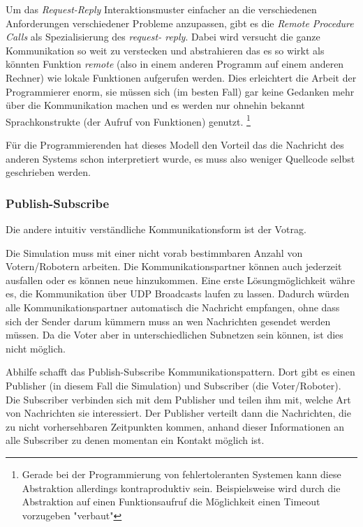 Um das \textit{Request-Reply} Interaktionsmuster einfacher an die verschiedenen Anforderungen verschiedener
Probleme anzupassen, gibt es die \textit{Remote Procedure Calls} als Spezialisierung des \textit{request-
reply}. Dabei wird versucht die ganze Kommunikation so weit zu verstecken und abstrahieren das es so wirkt
als k{\"{o}}nnten Funktion \textit{remote} (also in einem anderen Programm auf einem anderen Rechner) wie
lokale Funktionen aufgerufen werden. Dies erleichtert die Arbeit der Programmierer enorm, sie m{\"{u}}ssen
sich (im besten Fall) gar keine Gedanken mehr {\"{u}}ber die Kommunikation machen und es werden nur
ohnehin bekannt Sprachkonstrukte (der Aufruf von Funktionen) genutzt.
\footnote{Gerade bei der Programmierung von fehlertoleranten Systemen kann diese Abstraktion allerdings
kontraproduktiv sein. Beispielsweise wird durch die Abstraktion auf einen Funktionsaufruf die M{\"{o}}glichkeit
einen Timeout vorzugeben "verbaut"}

F{\"{u}}r die Programmierenden hat dieses Modell den Vorteil das die Nachricht des anderen Systems schon
interpretiert wurde, es muss also weniger Quellcode selbst geschrieben werden.

\subsubsection{Publish-Subscribe}
Die andere intuitiv verst{\"{a}}ndliche Kommunikationsform ist der Votrag.

Die Simulation muss mit einer nicht vorab bestimmbaren Anzahl von Votern/Robotern arbeiten.
Die Kommunikationspartner k{\"{o}}nnen auch jederzeit ausfallen oder es k{\"{o}}nnen neue hinzukommen.
Eine erste L{\"{o}}sungm{\"{o}}glichkeit w{\"{a}}hre es, die Kommunikation {\"{u}}ber UDP Broadcasts
laufen zu lassen. Dadurch w{\"{u}}rden alle Kommunikationspartner automatisch die Nachricht empfangen, ohne
dass sich der Sender darum k{\"{u}}mmern muss an wen Nachrichten gesendet werden m{\"{u}}ssen. Da die
Voter aber in unterschiedlichen Subnetzen sein k{\"{o}}nnen, ist dies nicht m{\"{o}}glich.

Abhilfe schafft das Publish-Subscribe Kommunikationspattern\cite{pubsub}. Dort gibt es einen Publisher (in
diesem Fall die Simulation) und Subscriber (die Voter/Roboter). Die Subscriber verbinden sich mit dem
Publisher und teilen ihm mit, welche Art von Nachrichten sie interessiert. Der Publisher verteilt dann die
Nachrichten, die zu nicht vorhersehbaren Zeitpunkten kommen, anhand dieser Informationen an alle Subscriber zu denen momentan ein Kontakt m{\"{o}}glich ist.

